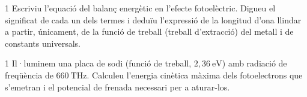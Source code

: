 \begin{apartat}{1}
Escriviu l'equació del balanç energètic en l'efecte fotoelèctric. Digueu el significat de cada un dels termes i deduïu l'expressió de la longitud d'ona llindar a partir, únicament, de la funció de treball (treball d'extracció) del metall i de constants universals.
\end{apartat}

\begin{apartat}{1}
Il·luminem una placa de sodi (funció de treball, $2,36\ \mathrm{eV}$) amb radiació de freqüència de $660\ \mathrm{THz}$. Calculeu l'energia cinètica màxima dels fotoelectrons que s'emetran i el potencial de frenada necessari per a aturar-los.
\end{apartat}

